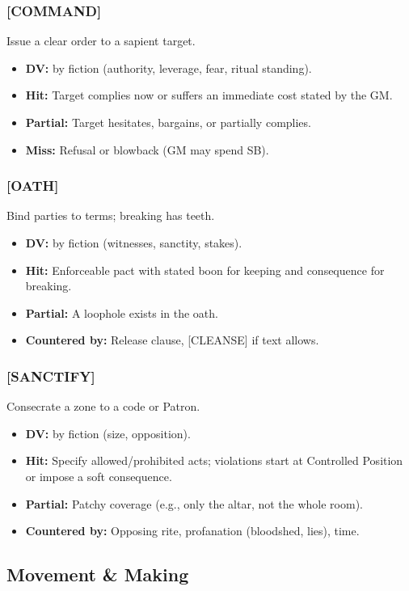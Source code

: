\subsubsection{[COMMAND]}
Issue a clear order to a sapient target.
\begin{itemize}
  \item \textbf{DV:} by fiction (authority, leverage, fear, ritual standing).
  \item \textbf{Hit:} Target complies now or suffers an immediate cost stated by the GM.
  \item \textbf{Partial:} Target hesitates, bargains, or partially complies.
  \item \textbf{Miss:} Refusal or blowback (GM may spend SB).
\end{itemize}

\subsubsection{[OATH]}
Bind parties to terms; breaking has teeth.
\begin{itemize}
  \item \textbf{DV:} by fiction (witnesses, sanctity, stakes).
  \item \textbf{Hit:} Enforceable pact with stated boon for keeping and consequence for breaking.
  \item \textbf{Partial:} A loophole exists in the oath.
  \item \textbf{Countered by:} Release clause, [CLEANSE] if text allows.
\end{itemize}

\subsubsection{[SANCTIFY]}
Consecrate a zone to a code or Patron.
\begin{itemize}
  \item \textbf{DV:} by fiction (size, opposition).
  \item \textbf{Hit:} Specify allowed/prohibited acts; violations start at Controlled Position or impose a soft consequence.
  \item \textbf{Partial:} Patchy coverage (e.g., only the altar, not the whole room).
  \item \textbf{Countered by:} Opposing rite, profanation (bloodshed, lies), time.
\end{itemize}

\subsection{Movement \& Making}

